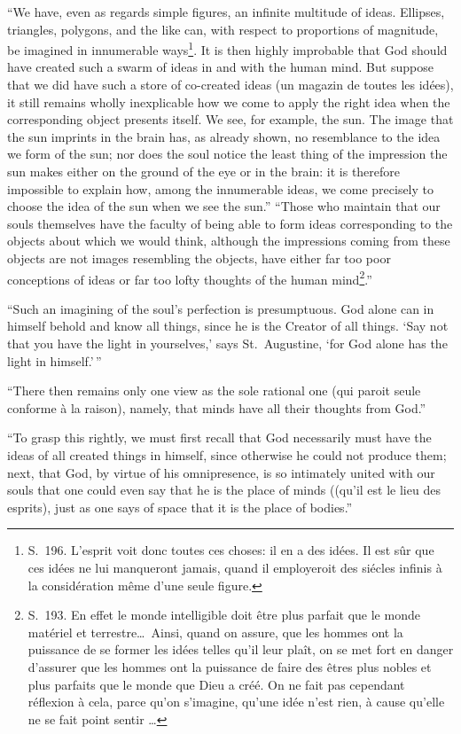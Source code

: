 \documentclass[12pt,a4paper]{article}
\begin{document}
``We have, even as regards simple figures, an infinite multitude of ideas.
Ellipses, triangles, polygons, and the like can, with respect to proportions of
magnitude, be imagined in innumerable ways\footnote{S.~196. L'esprit voit donc
toutes ces choses: il en a des idées. Il est sûr que ces idées ne lui manqueront
jamais, quand il employeroit des siécles infinis à la considération même d'une
seule figure.}. It is then highly improbable that God should have created such a
swarm of ideas in and with the human mind. But suppose that we did have such a
store of co-created ideas (un magazin de toutes les idées), it still remains
wholly inexplicable how we come to apply the right idea when the corresponding
object presents itself. We see, for example, the sun. The image that the sun
imprints in the brain has, as already shown, no resemblance to the idea we form of
the sun; nor does the soul notice the least thing of the impression the sun makes
either on the ground of the eye or in the brain: it is therefore impossible to
explain how, among the innumerable ideas, we come precisely to choose the idea of
the sun when we see the sun.''
``Those who maintain that our souls themselves have the faculty of being able to
form ideas corresponding to the objects about which we would think, although the
impressions coming from these objects are not images resembling the objects, have
either far too poor conceptions of ideas or far too lofty thoughts of the human
mind\footnote{S.~193. En effet le monde intelligible doit être plus parfait que le
monde matériel et terrestre\dots\ Ainsi, quand on assure, que les hommes ont la
puissance de se former les idées telles qu'il leur plaît, on se met fort en danger
d'assurer que les hommes ont la puissance de faire des êtres plus nobles et plus
parfaits que le monde que Dieu a créé. On ne fait pas cependant réflexion à cela,
parce qu'on s'imagine, qu'une idée n'est rien, à cause qu'elle ne se fait point
sentir \dots}.''

``Such an imagining of the soul's perfection is presumptuous. God alone can in
himself behold and know all things, since he is the Creator of all things. `Say
not that you have the light in yourselves,' says St.\ Augustine, `for God alone
has the light in himself.'\,''

``There then remains only one view as the sole rational one (qui paroit seule
conforme à la raison), namely, that minds have all their thoughts from God.''

``To grasp this rightly, we must first recall that God necessarily must have the
ideas of all created things in himself, since otherwise he could not produce them;
next, that God, by virtue of his omnipresence, is so intimately united with our
souls that one could even say that he is the place of minds ((qu'il est le lieu des
esprits), just as one says of space that it is the place of bodies.''
\end{document}
